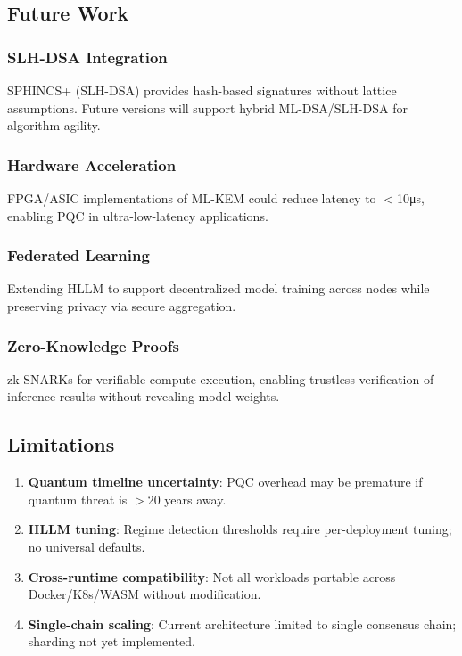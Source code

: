 \documentclass[11pt,twocolumn]{article}
\begin{document}
\subsection{Future Work}

\subsubsection{SLH-DSA Integration}

SPHINCS+ (SLH-DSA) provides hash-based signatures without lattice assumptions. Future versions will support hybrid ML-DSA/SLH-DSA for algorithm agility.

\subsubsection{Hardware Acceleration}

FPGA/ASIC implementations of ML-KEM could reduce latency to $<$10μs, enabling PQC in ultra-low-latency applications.

\subsubsection{Federated Learning}

Extending HLLM to support decentralized model training across nodes while preserving privacy via secure aggregation.

\subsubsection{Zero-Knowledge Proofs}

zk-SNARKs for verifiable compute execution, enabling trustless verification of inference results without revealing model weights.

\subsection{Limitations}

\begin{enumerate}
\item \textbf{Quantum timeline uncertainty}: PQC overhead may be premature if quantum threat is $>$20 years away.

\item \textbf{HLLM tuning}: Regime detection thresholds require per-deployment tuning; no universal defaults.

\item \textbf{Cross-runtime compatibility}: Not all workloads portable across Docker/K8s/WASM without modification.

\item \textbf{Single-chain scaling}: Current architecture limited to single consensus chain; sharding not yet implemented.
\end{enumerate}
\end{document}
